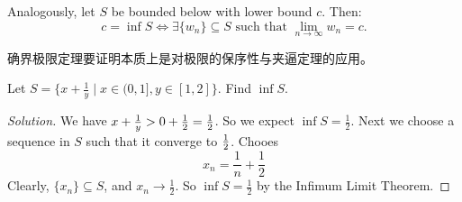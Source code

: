 \documentclass[
	UTF-8,
	11pt, %
	a4paper, %
]{LegrandOrangeBook}
\begin{document}
    \begin{theorem}
    Analogously, let $S$ be bounded below with lower bound $c$. Then:
    \[ c = \inf S \iff \exists \{w_n\} \subseteq S \text{ such that } \lim_{n \to \infty} w_n = c. \]
    \end{theorem}

    \begin{remark}
        确界极限定理要证明本质上是对极限的保序性与夹逼定理的应用。
    \end{remark}

    \newpage

    \begin{example}
    Let $S = \{ x + \frac{1}{y} \mid x \in (0, 1], y \in [1, 2] \}$. Find $\inf S$.

    \begin{proof}[Solution]
        We have $x + \frac{1}{y}  > 0 +\frac{1}{2} = {1 \over 2}$. So we expect $\inf S =\frac{1}{2}$.
        Next we choose a sequence in $S$ such that it converge to $1 \over 2$. Chooes 
        $$
        x_n = \dfrac{1}{n} + \dfrac{1}{2} 
        $$
        Clearly, $\{ x_n \} \subseteq S$, and $x_n \to \frac{1}{2}$. 
        So $\inf S = \frac{1}{2}$ by the Infimum Limit Theorem.
    \end{proof}

    \end{example}
\end{document}
